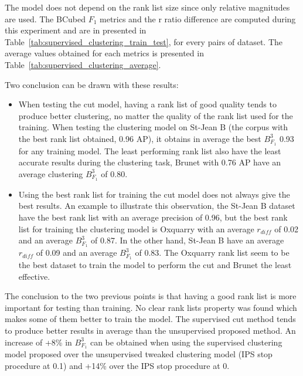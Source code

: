 The model does not depend on the rank list size since only relative magnitudes are used.
The BCubed $F_1$ metrics and the r ratio difference are computed during this experiment and are in presented in Table~\ref{tab:supervised_clustering_train_test}, for every pairs of dataset.
The average values obtained for each metrics is presented in Table~\ref{tab:supervised_clustering_average}.

Two conclusion can be drawn with these results:
\begin{itemize}
  \item
  When testing the cut model, having a rank list of good quality tends to produce better clustering, no matter the quality of the rank list used for the training.
  When testing the clustering model on St-Jean B (the corpus with the best rank list obtained, 0.96 AP), it obtains in average the best $B^3_{F_1}$ 0.93 for any training model.
  The least performing rank list also have the least accurate results during the clustering task, Brunet with 0.76 AP have an average clustering $B^3_{F_1}$ of 0.80.
  \item
  Using the best rank list for training the cut model does not always give the best results.
  An example to illustrate this observation, the St-Jean B dataset have the best rank list with an average precision of 0.96, but the best rank list for training the clustering model is Oxquarry with an average $r_{diff}$ of 0.02 and an average $B^3_{F_1}$ of 0.87.
  In the other hand, St-Jean B have an average $r_{diff}$ of 0.09 and an average $B^3_{F_1}$ of 0.83.
  The Oxquarry rank list seem to be the best dataset to train the model to perform the cut and Brunet the least effective.
\end{itemize}

The conclusion to the two previous points is that having a good rank list is more important for testing than training.
No clear rank lists property was found which makes some of them better to train the model.
The supervised cut method tends to produce better results in average than the unsupervised proposed method.
An increase of +8\% in $B^3_{F_1}$ can be obtained when using the supervised clustering model proposed over the unsupervised tweaked clustering model (IPS stop procedure at 0.1) and +14\% over the IPS stop procedure at 0.

